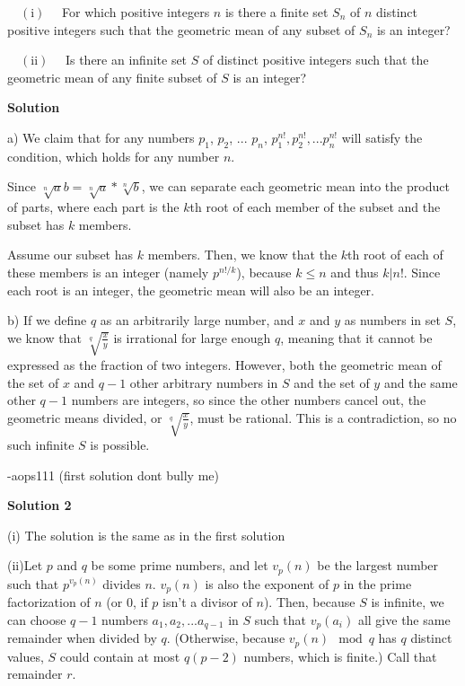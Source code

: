 \begin{enumerate}
 $\quad (\text{i})\quad$ For which positive integers $n$ is there a finite set $S_n$ of $n$ distinct positive integers such that the geometric mean of any subset of $S_n$ is an integer?


 $\quad (\text{ii})\quad$ Is there an infinite set $S$ of distinct positive integers such that the geometric mean of any finite subset of $S$ is an integer?


 



\textbf{Solution}

a) We claim that for any numbers $p_1$, $p_2$, ... $p_n$, $p_1^{n!}, p_2^{n!}, ... p_n^{n!}$ will satisfy the condition, which holds for any number $n$.

 Since $\sqrt[n] ab = \sqrt[n] a * \sqrt[n] b$, we can separate each geometric mean into the product of parts, where each part is the $k$th root of each member of the subset and the subset has $k$ members.

 Assume our subset has $k$ members. Then, we know that the $k$th root of each of these members is an integer (namely $p^{n!/k}$), because $k \leq n$ and thus $k  |  n!$. Since each root is an integer, the geometric mean will also be an integer.

 b) If we define $q$ as an arbitrarily large number, and $x$ and $y$ as numbers in set $S$, we know that ${\sqrt[q]{\frac{x}{y}}}$ is irrational for large enough $q$, meaning that it cannot be expressed as the fraction of two integers. However, both the geometric mean of the set of $x$ and $q-1$ other arbitrary numbers in $S$ and the set of $y$ and the same other $q-1$ numbers are integers, so since the other numbers cancel out, the geometric means divided, or ${\sqrt[q]{\frac{x}{y}}}$, must be rational. This is a contradiction, so no such infinite $S$ is possible.

 -aops111 (first solution dont bully me)

 



\textbf{Solution 2}

(i) The solution is the same as in the first solution

 (ii)Let $p$ and $q$ be some prime numbers, and let $v_p(n)$ be the largest number such that $p^{v_p(n)}$ divides $n$. $v_p(n)$ is also the exponent of $p$ in the prime factorization of $n$ (or $0$, if $p$ isn't a divisor of $n$). Then, because $S$ is infinite, we can choose $q-1$ numbers $a_1, a_2, ... a_{q-1}$ in $S$ such that $v_p(a_i)$ all give the same remainder when divided by $q$. (Otherwise, because $v_p(n) \mod q$ has $q$ distinct values, $S$ could contain at most $q(p-2)$ numbers, which is finite.) Call that remainder $r$.


\end{enumerate}
